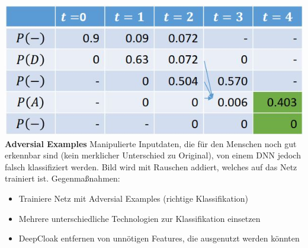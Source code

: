 \documentclass[12pt]{article}
\begin{document}
	\includegraphics[width=0.5\linewidth]{figures/ctc-dynamisch.JPG}\\
	\textbf{Adversial Examples} Manipulierte Inputdaten, die für den Menschen noch gut erkennbar sind (kein merklicher Unterschied zu Original), von einem DNN jedoch falsch klassifiziert werden. Bild wird mit Rauschen addiert, welches auf das Netz trainiert ist. Gegenmaßnahmen:
	\begin{itemize}
		\item Trainiere Netz mit Adversial Examples (richtige Klassifikation)
		\item Mehrere unterschiedliche Technologien zur Klassifikation einsetzen
		\item DeepCloak entfernen von unnötigen Features, die ausgenutzt werden könnten
	\end{itemize}
	
\end{document}
